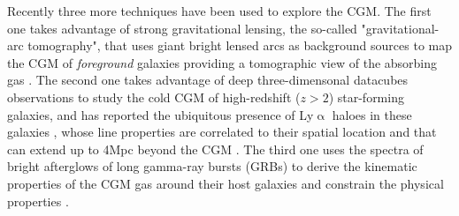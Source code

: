 \documentclass[longauth]{aa}
\begin{document}
Recently three more techniques have been used to explore the CGM. The first
one takes advantage of strong gravitational lensing, the so-called
"gravitational-arc tomography", that uses giant bright lensed arcs as
background sources to map the CGM of \textit{foreground} galaxies providing
a tomographic view of the absorbing gas \citep
{Lopez18,Claeyssens19,Lopez20,Tejos21,Mortensen21}. The second one takes
advantage of deep three-dimensonal datacubes observations to study the cold
CGM of high-redshift ($z > 2$) star-forming galaxies, and has reported the
ubiquitous presence of Ly$\upalpha$ haloes in these galaxies 
\citep{Steidel11,Matsuda12,Momose14,Wisotzki16,Leclercq17,Chen20}, whose line
properties are correlated to their spatial location 
\citep{Leclercq20} and that can extend up to 4Mpc beyond the CGM 
\citep{Chen20,Bacon21}. The third one uses the spectra of bright afterglows of
long gamma-ray bursts (GRBs) to derive the kinematic properties of the CGM
gas around their host galaxies and constrain the physical properties 
\citep{Gatkine19,Gatkine22}.
\end{document}
